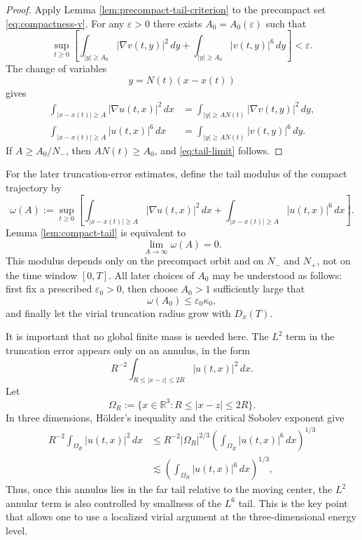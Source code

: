 \documentclass[smallextended,envcountsect,nospthms]{svjour3}
\numberwithin{equation}{section}
\theoremstyle{spbreak}
\theoremstyle{spdefbreak}
\theoremstyle{spdefbreak}
\newcommand{\R}{\mathbb R}
\newcommand{\eps}{\varepsilon}
\begin{document}
\begin{proof}
Apply Lemma \ref{lem:precompact-tail-criterion} to the precompact set \eqref{eq:compactness-v}. For any $\eps>0$ there exists $A_0=A_0(\eps)$ such that
\begin{equation*}
  \sup_{t\ge0}\left[
  \int_{|y|\ge A_0}|\nabla v(t,y)|^2\,dy
  +\int_{|y|\ge A_0}|v(t,y)|^6\,dy
  \right]<\eps.
\end{equation*}
The change of variables
\begin{equation*}
  y=N(t)(x-x(t))
\end{equation*}
gives
\begin{align*}
  \int_{|x-x(t)|\ge A}|\nabla u(t,x)|^2\,dx
  &=\int_{|y|\ge AN(t)}|\nabla v(t,y)|^2\,dy,\\
  \int_{|x-x(t)|\ge A}|u(t,x)|^6\,dx
  &=\int_{|y|\ge AN(t)}|v(t,y)|^6\,dy.
\end{align*}
If $A\ge A_0/N_-$, then $AN(t)\ge A_0$, and \eqref{eq:tail-limit} follows.
\end{proof}

For the later truncation-error estimates, define the tail modulus of the compact trajectory by
\begin{equation*}
  \omega(A):=\sup_{t\ge0}
  \left[
  \int_{|x-x(t)|\ge A}|\nabla u(t,x)|^2\,dx
  +\int_{|x-x(t)|\ge A}|u(t,x)|^6\,dx
  \right].
\end{equation*}
Lemma \ref{lem:compact-tail} is equivalent to
\begin{equation*}
  \lim_{A\to\infty}\omega(A)=0.
\end{equation*}
This modulus depends only on the precompact orbit and on $N_-$ and $N_+$, not on the time window $[0,T]$. All later choices of $A_0$ may be understood as follows: first fix a prescribed $\varepsilon_0>0$, then choose $A_0>1$ sufficiently large that
\begin{equation*}
  \omega(A_0)\le\varepsilon_0\kappa_0,
\end{equation*}
and finally let the virial truncation radius grow with $D_x(T)$.

It is important that no global finite mass is needed here. The $L^2$ term in the truncation error appears only on an annulus, in the form
\[
  R^{-2}\int_{R\le |x-z|\le 2R}|u(t,x)|^2\,dx.
\]
Let
\begin{equation*}
  \Omega_R:=\{x\in\R^3:R\le |x-z|\le2R\}.
\end{equation*}
In three dimensions, H\"older's inequality and the critical Sobolev exponent give
\[
\begin{aligned}
  R^{-2}\int_{\Omega_R}|u(t,x)|^2\,dx
  &\le R^{-2}|\Omega_R|^{2/3}
       \left(\int_{\Omega_R}|u(t,x)|^6\,dx\right)^{1/3}  \\
  &\lesssim \left(\int_{\Omega_R}|u(t,x)|^6\,dx\right)^{1/3},
\end{aligned}
\]
Thus, once this annulus lies in the far tail relative to the moving center, the $L^2$ annular term is also controlled by smallness of the $L^6$ tail. This is the key point that allows one to use a localized virial argument at the three-dimensional energy level.
\end{document}
